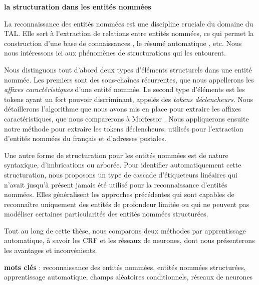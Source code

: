 \documentclass[12pt,a4paper,times,twoside,openright]{report}
\begin{document}



%
%

\cleardoublepage
\clearpage\value{page}\null\pagestyle{empty}\newpage

\pagestyle{empty}
\linespread{1.0}

\begin{center}\textbf{la structuration dans les entités nommées}\end{center}
\small{
La reconnaissance des entités nommées est une discipline cruciale du domaine du TAL. Elle sert à l'extraction de relations entre entités nommées, ce qui permet la construction d'une base de connaissances \citep{surdeanu2014overview}, le résumé automatique \citep{nobata2002summarization}, etc. Nous nous intéressons ici aux phénomènes de structurations qui les entourent.

Nous distinguons tout d'abord deux types d'éléments structurels dans une entité nommée. Les premiers sont des sous-chaînes récurrentes, que nous appellerons les \emph{affixes caractéristiques} d'une entité nommée. Le second type d'éléments est les tokens ayant un fort pouvoir discriminant, appelés des \emph{tokens déclencheurs}. Nous détaillerons l'algorithme que nous avons mis en place pour extraire les affixes caractéristiques, que nous comparerons à Morfessor \citep{creutz2005unsupervised}. Nous appliquerons ensuite notre méthode pour extraire les tokens déclencheurs, utilisés pour l'extraction d'entités nommées du français et d'adresses postales.

Une autre forme de structuration pour les entités nommées est de nature syntaxique, d'imbrications ou arborée. Pour identifier automatiquement cette structuration, nous proposons un type de cascade d'étiqueteurs linéaires qui n'avait jusqu'à présent jamais été utilisé pour la reconnaissance d'entités nommées. Elles généralisent les approches précédentes qui sont capables de reconnaître uniquement des entités de profondeur limitée ou qui ne peuvent pas modéliser certaines particularités des entités nommées structurées.

Tout au long de cette thèse, nous comparons deux méthodes par apprentissage automatique, à savoir les CRF et les réseaux de neurones, dont nous présenterons les avantages et inconvénients.

\begin{flushleft}
\textbf{mots clés} : reconnaissance des entités nommées, entités nommées structurées, apprentissage automatique, champs aléatoires conditionnels, réseaux de neurones
\end{flushleft}

 }
\end{document}
